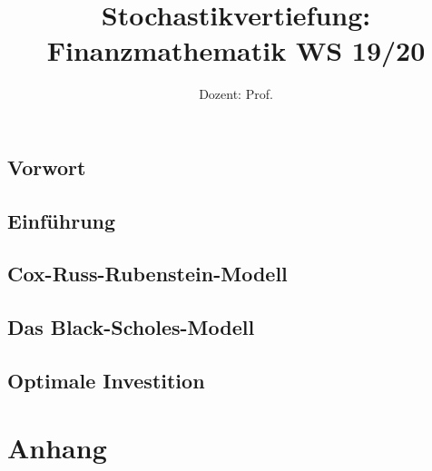 \documentclass[ngerman,a4paper,order=firstname]{../../texmf/tex/latex/mathscript/mathscript}
\title{\textbf{Stochastikvertiefung: Finanzmathematik WS 19/20}}
\author{Dozent: Prof. \person{Martin.Keller-Ressel}}
\begin{document}
\renewcommand{\F}{\mathscr F}
\pagestyle{plain}

\maketitle

\hypertarget{tocpage}{}
\tableofcontents
{}

\pagebreak
{}
\pagestyle{fancy}

\chapter*{Vorwort}
%

\chapter{Einführung}

\chapter{Cox-Russ-Rubenstein-Modell}

\chapter{Das Black-Scholes-Modell}

\chapter{Optimale Investition}


\part*{Anhang}
\appendix

\nocite{*}




\printindex
\end{document}
